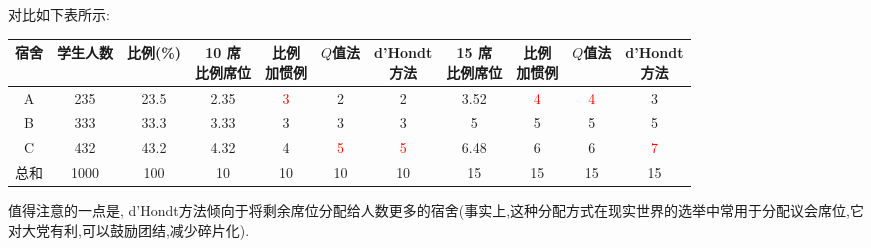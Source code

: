 \documentclass{article}
\newcommand{\red}[1]{\textcolor{red}{#1}}
\begin{document}
对比如下表所示:

\begin{center}
    \begin{tabular}{|c|c|c|c|c|c|c|c|c|c|c|}
    \hline
    宿舍 & 学生人数 & 比例(\%)& \makecell{10 席\\比例席位} & \makecell{比例\\加惯例} & $Q$值法 & \makecell{d'Hondt\\方法} & \makecell{15 席\\比例席位} & \makecell{比例\\加惯例} & $Q$值法 & \makecell{d'Hondt\\方法} \\
    \hline
    A & 235 & 23.5 &2.35 & \red{3}&2 & 2&  3.52 & \red{4} & \red{4} & 3 \\
    \hline
    B & 333 & 33.3 &3.33 & 3&3 & 3&  5 & 5 & 5 & 5 \\
    \hline
    C & 432 & 43.2 & 4.32& 4& \red{5}&\red{5} &  6.48 & 6 & 6 & \red{7} \\
    \hline
    总和 & 1000 & 100 & 10& 10&10 &10 &  15 & 15 & 15 & 15 \\
    \hline
    \end{tabular}
\end{center}

值得注意的一点是, d'Hondt方法倾向于将剩余席位分配给人数更多的宿舍(事实上,这种分配方式在现实世界的选举中常用于分配议会席位,它对大党有利,可以鼓励团结,减少碎片化).
\end{document}
